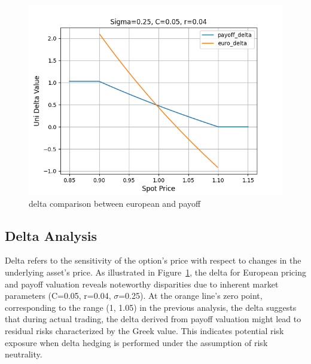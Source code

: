 \documentclass[conference]{IEEEtran}
\begin{document}
\begin{figure}
    \centering
    \includegraphics[width=1\linewidth]{figures/differentmodel-delta.png}
    \caption{delta comparison between european and payoff}
    \label{fig:spot_delta}
\end{figure}


\subsection{Delta Analysis}
Delta refers to the sensitivity of the option's price with respect to changes in the underlying asset's price.
As illustrated in Figure~\ref{fig:spot_delta}, the delta for European pricing and payoff valuation reveals noteworthy disparities due to inherent market parameters (C=0.05, r=0.04, $\sigma$=0.25).
 At the orange line's zero point, corresponding to the range (1, 1.05) in the previous analysis, the delta suggests that during actual trading, the delta derived from payoff valuation might lead to residual risks characterized by the Greek value. This indicates potential risk exposure when delta hedging is performed under the assumption of risk neutrality.
\end{document}
